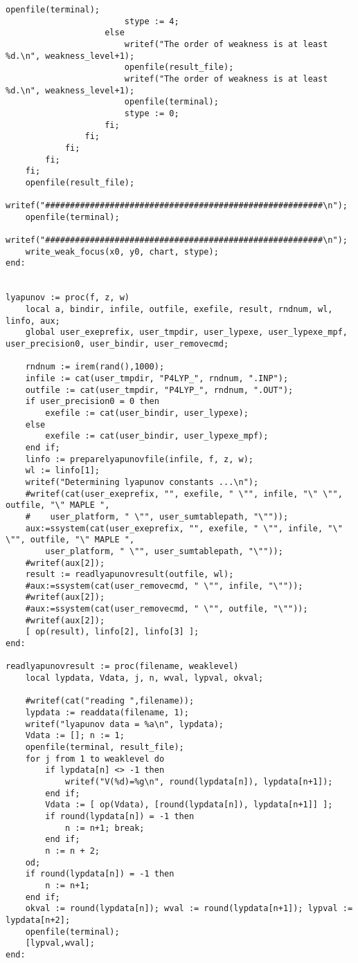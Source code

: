 \documentclass[a4paper,10pt]{article}
\begin{document}
\begin{lstlisting}[name=weakfocus]
                        openfile(terminal);
                        stype := 4;
                    else
                        writef("The order of weakness is at least %d.\n", weakness_level+1);
                        openfile(result_file);
                        writef("The order of weakness is at least %d.\n", weakness_level+1);
                        openfile(terminal);
                        stype := 0;
                    fi;
                fi;
            fi;
        fi;
    fi;
    openfile(result_file);
    writef("########################################################\n");
    openfile(terminal);
    writef("########################################################\n");
    write_weak_focus(x0, y0, chart, stype);
end:


lyapunov := proc(f, z, w)
    local a, bindir, infile, outfile, exefile, result, rndnum, wl, linfo, aux;
    global user_exeprefix, user_tmpdir, user_lypexe, user_lypexe_mpf, user_precision0, user_bindir, user_removecmd;

    rndnum := irem(rand(),1000);
    infile := cat(user_tmpdir, "P4LYP_", rndnum, ".INP");
    outfile := cat(user_tmpdir, "P4LYP_", rndnum, ".OUT");
    if user_precision0 = 0 then
        exefile := cat(user_bindir, user_lypexe);
    else
        exefile := cat(user_bindir, user_lypexe_mpf);
    end if;
    linfo := preparelyapunovfile(infile, f, z, w);
    wl := linfo[1];
    writef("Determining lyapunov constants ...\n");
    #writef(cat(user_exeprefix, "", exefile, " \"", infile, "\" \"", outfile, "\" MAPLE ",
    #    user_platform, " \"", user_sumtablepath, "\""));
    aux:=ssystem(cat(user_exeprefix, "", exefile, " \"", infile, "\" \"", outfile, "\" MAPLE ",
        user_platform, " \"", user_sumtablepath, "\""));
    #writef(aux[2]);
    result := readlyapunovresult(outfile, wl);
    #aux:=ssystem(cat(user_removecmd, " \"", infile, "\""));
    #writef(aux[2]);
    #aux:=ssystem(cat(user_removecmd, " \"", outfile, "\""));
    #writef(aux[2]);
    [ op(result), linfo[2], linfo[3] ];
end:

readlyapunovresult := proc(filename, weaklevel)
    local lypdata, Vdata, j, n, wval, lypval, okval;

    #writef(cat("reading ",filename));
    lypdata := readdata(filename, 1);
    writef("lyapunov data = %a\n", lypdata);
    Vdata := []; n := 1;
    openfile(terminal, result_file);
    for j from 1 to weaklevel do
        if lypdata[n] <> -1 then
            writef("V(%d)=%g\n", round(lypdata[n]), lypdata[n+1]);
        end if;
        Vdata := [ op(Vdata), [round(lypdata[n]), lypdata[n+1]] ];
        if round(lypdata[n]) = -1 then
            n := n+1; break;
        end if;
        n := n + 2;
    od;
    if round(lypdata[n]) = -1 then
        n := n+1;
    end if;
    okval := round(lypdata[n]); wval := round(lypdata[n+1]); lypval := lypdata[n+2];
    openfile(terminal);
    [lypval,wval];
end:


\end{lstlisting}
\end{document}
